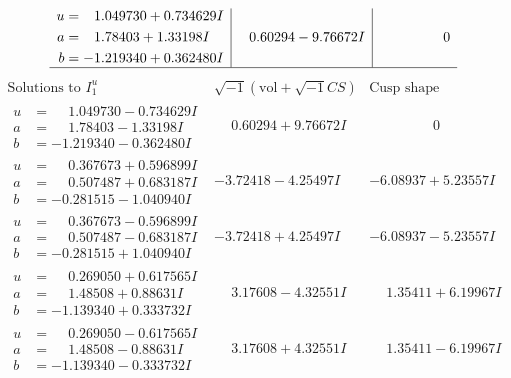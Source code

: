 \documentclass[1p]{elsarticle_modified}
\theoremstyle{definition}
\newcommand{\I}{\sqrt{-1}}
\begin{document}
$$\begin{array}{c|c|c}
\begin{aligned}
u &= \phantom{-}1.049730 + 0.734629 I \\
a &= \phantom{-}1.78403 + 1.33198 I \\
b &= -1.219340 + 0.362480 I\end{aligned}
 & \phantom{-}0.60294 - 9.76672 I & \phantom{-0.000000 } 0\\
 \hline 
 \end{array}$$\newpage$$\begin{array}{c|c|c}  
\text{Solutions to }I^u_{1}& \I (\text{vol} + \sqrt{-1}CS) & \text{Cusp shape}\\
 \hline 
\begin{aligned}
u &= \phantom{-}1.049730 - 0.734629 I \\
a &= \phantom{-}1.78403 - 1.33198 I \\
b &= -1.219340 - 0.362480 I\end{aligned}
 & \phantom{-}0.60294 + 9.76672 I & \phantom{-0.000000 } 0 \\ \hline\begin{aligned}
u &= \phantom{-}0.367673 + 0.596899 I \\
a &= \phantom{-}0.507487 + 0.683187 I \\
b &= -0.281515 - 1.040940 I\end{aligned}
 & -3.72418 - 4.25497 I & -6.08937 + 5.23557 I \\ \hline\begin{aligned}
u &= \phantom{-}0.367673 - 0.596899 I \\
a &= \phantom{-}0.507487 - 0.683187 I \\
b &= -0.281515 + 1.040940 I\end{aligned}
 & -3.72418 + 4.25497 I & -6.08937 - 5.23557 I \\ \hline\begin{aligned}
u &= \phantom{-}0.269050 + 0.617565 I \\
a &= \phantom{-}1.48508 + 0.88631 I \\
b &= -1.139340 + 0.333732 I\end{aligned}
 & \phantom{-}3.17608 - 4.32551 I & \phantom{-}1.35411 + 6.19967 I \\ \hline\begin{aligned}
u &= \phantom{-}0.269050 - 0.617565 I \\
a &= \phantom{-}1.48508 - 0.88631 I \\
b &= -1.139340 - 0.333732 I\end{aligned}
 & \phantom{-}3.17608 + 4.32551 I & \phantom{-}1.35411 - 6.19967 I \\ \hline\begin{aligned}

\end{aligned}
\end{array}$$
\end{document}
